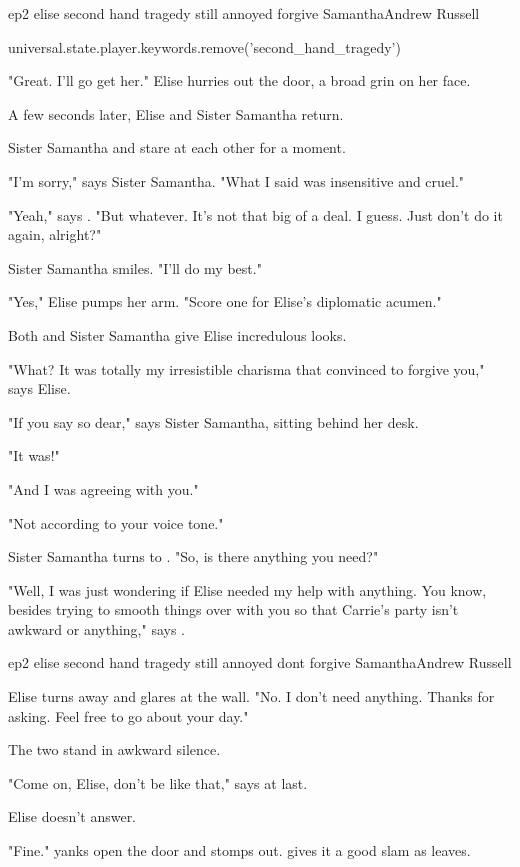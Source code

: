 \documentclass{book}
\begin{document}
\begin{childnode}{ep2 elise second hand tragedy still annoyed forgive Samantha}{Andrew Russell}

    \begin{code}

        universal.state.player.keywords.remove('second\_hand\_tragedy')

    \end{code}

    "Great. I'll go get her." Elise hurries out the door, a broad grin on her face.

    A few seconds later, Elise and Sister Samantha return.

    Sister Samantha and \name{} stare at each other for a moment.

    "I'm sorry," says Sister Samantha. "What I said was insensitive and cruel."

    "Yeah," says \name{}. "But whatever. It's not that big of a deal. I guess. Just don't do it again, alright?"

    Sister Samantha smiles. "I'll do my best."

    "Yes," Elise pumps her arm. "Score one for Elise's diplomatic acumen."

    Both \name{} and Sister Samantha give Elise incredulous looks.

    "What? It was totally my irresistible charisma that convinced \name{} to forgive you," says Elise.

    "If you say so dear," says Sister Samantha, sitting behind her desk.

    "It was!"

    "And I was agreeing with you."

    "Not according to your voice tone."

    Sister Samantha turns to \name{}. "So, is there anything you need?"

    "Well, I was just wondering if Elise needed my help with anything. You know, besides trying to smooth things over with you so that Carrie's party isn't awkward or anything," says \name{}.


\end{childnode}

\begin{childnode}{ep2 elise second hand tragedy still annoyed dont forgive Samantha}{Andrew Russell}


    Elise turns away and glares at the wall. "No. I don't need anything. Thanks for asking. Feel free to go about your day."

    The two stand in awkward silence.

    "Come on, Elise, don't be like that," says \name{} at last.

    Elise doesn't answer.

    "Fine." \name{} yanks open the door and stomps out. \HeShe{} gives it a good slam as \heshe{} leaves.

\end{childnode}
\end{document}
